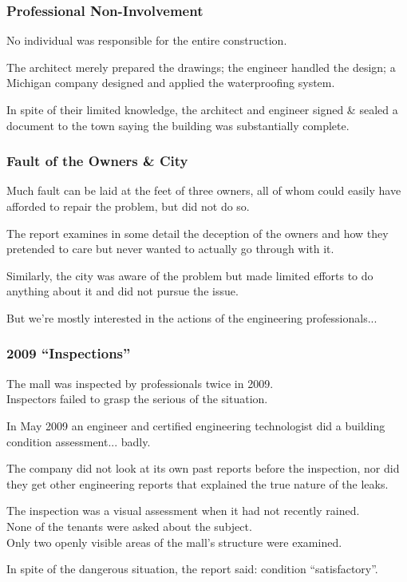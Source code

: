 \begin{frame}
\frametitle{Professional Non-Involvement}

No individual was responsible for the entire construction.

The architect merely prepared the drawings; the engineer handled the design; a Michigan company designed and applied the waterproofing system.

In spite of their limited knowledge, the architect and engineer signed \& sealed a document to the town saying the building was substantially complete.

\end{frame}



\begin{frame}
\frametitle{Fault of the Owners \& City}

Much fault can be laid at the feet of three owners, all of whom could easily have afforded to repair the problem, but did not do so.

The report examines in some detail the deception of the owners and how they pretended to care but never wanted to actually go through with it.

Similarly, the city was aware of the problem but made limited efforts to do anything about it and did not pursue the issue.

But we're mostly interested in the actions of the engineering professionals...

\end{frame}



\begin{frame}
\frametitle{2009 ``Inspections''}

The mall was inspected by professionals twice in 2009.\\
\quad Inspectors failed to grasp the serious of the situation.

In May 2009 an engineer and certified engineering technologist did a building condition assessment... badly.

The company did not look at its own past reports before the inspection, nor did they get other engineering reports that explained the true nature of the leaks.

The inspection was a visual assessment when it had not recently rained.\\
\quad None of the tenants were asked about the subject.\\
\quad Only two openly visible areas of the mall's structure were examined.

In spite of the dangerous situation, the report said: condition ``satisfactory''.


\end{frame}



